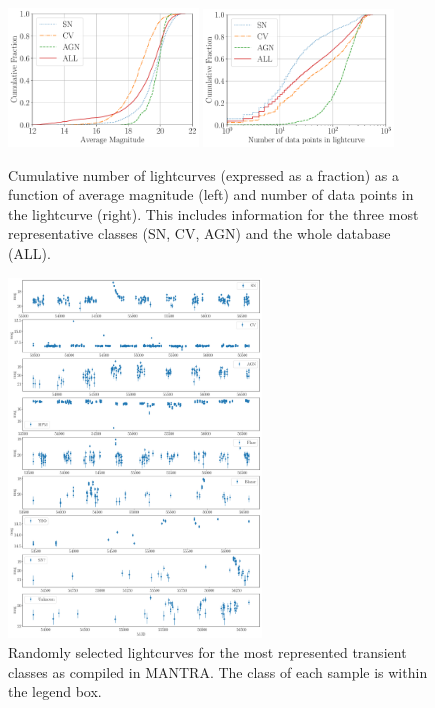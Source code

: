 \documentclass[twocolumn]{aastex62}
\begin{document}
\begin{figure}
\begin{center}
  \includegraphics[width=0.45\textwidth]{cumulative_magnitude.pdf}
  \includegraphics[width=0.45\textwidth]{cumulative_classes.pdf}
\end{center}
  \caption{Cumulative number of lightcurves (expressed as a fraction)
    as a function of average magnitude (left) and number of data
    points in the lightcurve (right).
    This includes information for the three most representative
    classes (SN, CV, AGN) and the whole database (ALL).}
  \label{fig:cumulative}
\end{figure} 


\begin{figure}
\begin{center}
  \includegraphics[width=0.6\textwidth]{examples_transient.pdf}
\end{center}
  \caption{Randomly selected lightcurves for the most represented transient classes as compiled in MANTRA. The class of each sample is within the legend box. }  
  \label{fig:examples_transient}
\end{figure} 
\end{document}
